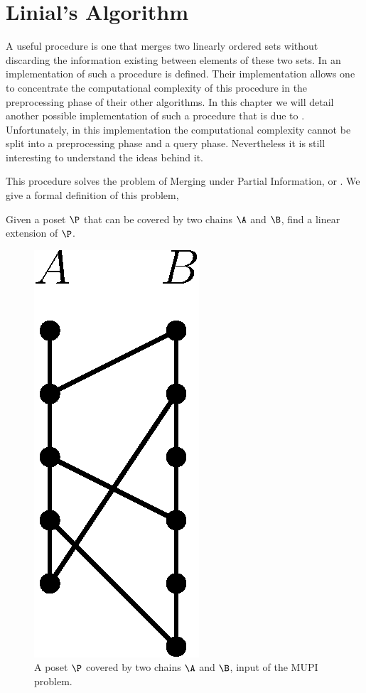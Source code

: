 \section{Linial's Algorithm}

A useful procedure is one that merges two linearly ordered sets without
discarding the information existing between elements of these two sets. In
\citet*{cardinal:2013} an implementation of such a procedure is defined. Their
implementation allows one to concentrate the computational complexity of this
procedure in the preprocessing phase of their other algorithms. In this chapter
we will detail another possible implementation of such a procedure that is due
to \citet*{linial:1984}. Unfortunately, in this implementation the
computational complexity cannot be split into a preprocessing phase and a query
phase. Nevertheless it is still interesting to understand the ideas behind it.

This procedure solves the problem of Merging under Partial Information, or
. We give a formal definition of this problem,

\begin{problem}
Given a poset \(\P\) that can be covered by two chains \(\A\) and \(\B\), find a
linear extension of \(\P\).
\end{problem}

\begin{figure}
\centering
\includegraphics[height=0.2\textheight]{fig/supi/mupi}
\caption{A poset \(\P\) covered by two chains \(\A\) and \(\B\),
input of the MUPI problem.}
\label{fig:supi:mupi}
\end{figure}

